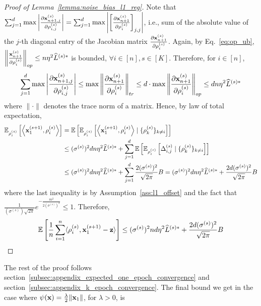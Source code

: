 \begin{proof}[Proof of Lemma~\ref{lemma:noise_bias_l1_reg}]
Note that $\sum_{j=1}^{d} \max \left| \frac{\partial {\mathbf{x}}_{n+1,j}^{(s)}}{\partial \rho_{i, j}^{(s)}} \right| = \sum_{j=1}^{d} \max \left| \left[\frac{\partial {\mathbf{x}}_{n+1}^{(s)}}{\partial \rho_{i}^{(s)}}\right]_{j,j} \right|$, i.e., sum of the absolute value of the $j$-th diagonal entry of the Jacobian matrix $\frac{\partial {\mathbf{x}}_{n+1}^{(s)}}{\partial \rho_i^{(s)}}$. 
Again, by Eq.~\ref{eq:op_ub}, $\left\| \frac{{\mathbf{x}}_{n+1}^{(s)}}{\partial \rho_i^{(s)}} \right\|_{op} \leq n \eta^2 \widehat{L}^{(s)*}$ is bounded, $\forall i\in [n], s\in [K]$.
Therefore, for $i\in [n]$,
\begin{align}
    \sum_{j=1}^{d}\max\left|\frac{\partial {\mathbf{x}}_{n+1,j}^{(s)}}{\partial \rho_{i, j}^{(s)}}\right|
    \leq \max \left\| \frac{\partial {\mathbf{x}}_{n+1}^{(s)}}{\partial \rho_{i}^{(s)}} \right\|_{tr}
    \leq d \cdot \max \left\| \frac{\partial {\mathbf{x}}_{n+1}^{(s)}}{\partial \rho_{i}^{(s)}} \right\|_{op}
    \leq d n \eta^2 \widehat{L}^{(s)*}
\end{align}
where $\|\cdot\|$ denotes the trace norm of a matrix. Hence, by law of total expectation,
\begin{align}
    \mathbb{E}_{\rho_{i}^{(s)}}\left[ \left\langle {\mathbf{x}}_1^{(s+1)}, \rho_i^{(s)} \right\rangle \right]
    &= \mathbb{E}\left[\mathbb{E}_{\rho_i^{(s)}}\left[\left\langle {\mathbf{x}}_{1}^{(s+1)}, \rho_i^{(s)} \right\rangle \mid \{\rho_k^{(s)}\}_{k\neq i}\right]\right]\\
    &\leq (\sigma^{(s)})^2 d n \eta^2 \widehat{L}^{(s)*}
    + \sum_{j=1}^{d}\mathbb{E}\left[\mathbb{E}_{\rho_i^{(s)}}\left[ \Delta_{i,j}^{(s)} \mid  \{\rho_{k}^{(s)}\}_{k\neq i}\right]\right]\\
    &\leq (\sigma^{(s)})^2 d n \eta^2 \widehat{L}^{(s)*}
    + \sum_{j=1}^{d} \frac{2 (\sigma^{(s)})^2}{\sqrt{2\pi}} B
    = (\sigma^{(s)})^2 d n \eta^2 \widehat{L}^{(s)*}
    + \frac{2 d (\sigma^{(s)})^2 }{\sqrt{2\pi}} B
\end{align}
where the last inequality is by Assumption~\ref{ass:l1_offset} and the fact that $\frac{1}{(\sigma^{(s)})\sqrt{2\pi}} e^{-\frac{m^2}{2(\sigma^{(s)})^2}}\leq 1$. Therefore,
\begin{align}
    \mathbb{E}\left[\frac{1}{n}\sum_{i=1}^{n} \langle \rho_i^{(s)}, {\mathbf{x}}_1^{(s+1)} - {\mathbf{z}} \rangle \right] 
    \leq (\sigma^{(s)})^2 nd \eta^2 \widehat{L}^{(s)*}
    + \frac{2 d (\sigma^{(s)})^2}{\sqrt{2\pi}} B
\end{align}

\end{proof}


The rest of the proof follows section~\ref{subsec:appendix_expected_one_epoch_convergence} and section~\ref{subsec:appendix_k_epoch_convergence}. The final bound we get in the case where $\psi({\mathbf{x}}) = \frac{\lambda}{2}\|{\mathbf{x}}_1\|$, for $\lambda > 0$, is


